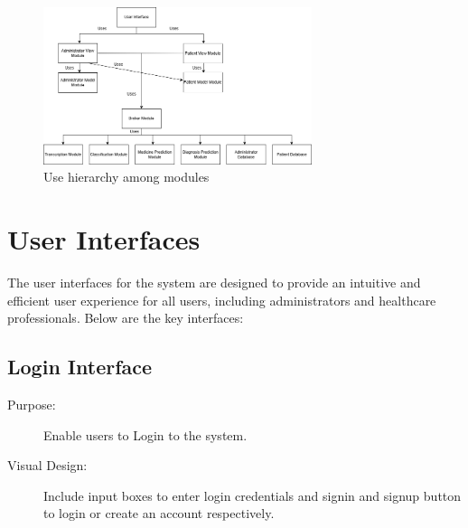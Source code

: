 \documentclass[12pt, titlepage]{article}
\begin{document}


\begin{figure}[H]
\centering
\includegraphics[width=0.7\textwidth]{user-hierarchy.png}
\caption{Use hierarchy among modules}
\label{FigUH}
\end{figure}


\section{User Interfaces} \label{sec:UserInterfaces}

The user interfaces for the system are designed to provide an intuitive and efficient user experience for all users, including administrators and healthcare professionals. Below are the key interfaces:


\subsection{Login Interface}
\begin{description}
    \item[Purpose:]Enable users to Login to the system.
   
    \item[Visual Design:]Include input boxes to enter login credentials and signin and signup button to login or create an account respectively.
\end{description}
\end{document}
